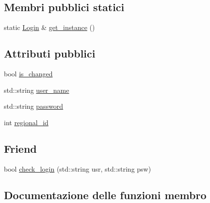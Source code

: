 \subsection*{Membri pubblici statici}
\begin{DoxyCompactItemize}
\item 
static \hyperlink{structmm_1_1model_1_1authentication_1_1_login}{Login} \& \hyperlink{structmm_1_1model_1_1authentication_1_1_login_a37112a637ed012c96a96c5a2366f4220}{get\+\_\+instance} ()
\end{DoxyCompactItemize}
\subsection*{Attributi pubblici}
\begin{DoxyCompactItemize}
\item 
bool \hyperlink{structmm_1_1model_1_1authentication_1_1_login_aa74e292b2be0f1e2146576108e74db97}{is\+\_\+changed}
\item 
std\+::string \hyperlink{structmm_1_1model_1_1authentication_1_1_login_aeb7a295a6770bf778d747903045fe288}{user\+\_\+name}
\item 
std\+::string \hyperlink{structmm_1_1model_1_1authentication_1_1_login_adc6b1c53cf3e012f10c8b315a1df364f}{password}
\item 
int \hyperlink{structmm_1_1model_1_1authentication_1_1_login_a3b3c96185f5ad0c1e9ea15cd401ce064}{regional\+\_\+id}
\end{DoxyCompactItemize}
\subsection*{Friend}
\begin{DoxyCompactItemize}
\item 
bool \hyperlink{structmm_1_1model_1_1authentication_1_1_login_a5023cb987e79151f2a1ed18b9a86a3e8}{check\+\_\+login} (std\+::string usr, std\+::string psw)
\end{DoxyCompactItemize}


\subsection{Documentazione delle funzioni membro}
\mbox{\label{structmm_1_1model_1_1authentication_1_1_login_a37112a637ed012c96a96c5a2366f4220}} 
